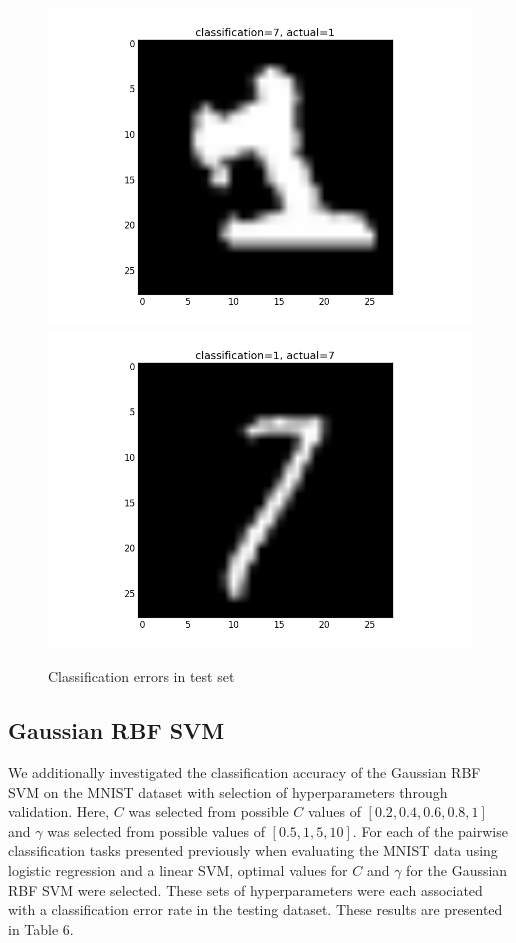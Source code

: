 \documentclass{article}
\begin{document}
\begin{figure}[width=\linewidth]
\centering
\begin{multicols}{2}
  \includegraphics[width=1.2\linewidth]{code/P4/error,1.png}
  \includegraphics[width=1.2\linewidth]{code/P4/error,7.png}
\end{multicols}
\caption{Classification errors in test set}
\end{figure}

\subsection{Gaussian RBF SVM}

We additionally investigated the classification accuracy of the Gaussian RBF SVM on the MNIST dataset with selection of hyperparameters through validation. Here, $C$ was selected from possible $C$ values of $[0.2, 0.4, 0.6, 0.8, 1]$ and $\gamma$ was selected from possible values of $[0.5, 1, 5, 10]$. For each of the pairwise classification tasks presented previously when evaluating the MNIST data using logistic regression and a linear SVM, optimal values for $C$ and $\gamma$ for the Gaussian RBF SVM were selected. These sets of hyperparameters were each associated with a classification error rate in the testing dataset. These results are presented in Table 6. \\
\end{document}
